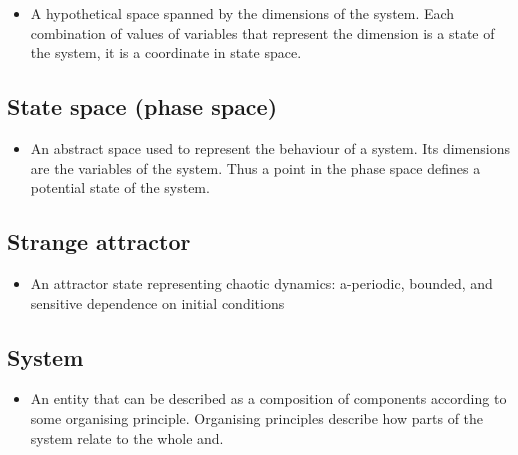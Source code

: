 \documentclass[12pt,]{book}
\providecommand{\tightlist}{%
  \setlength{\itemsep}{0pt}\setlength{\parskip}{0pt}}
\begin{document}
\begin{itemize}
\tightlist
\item
  A hypothetical space spanned by the dimensions of the system. Each combination of values of variables that represent the dimension is a state of the system, it is a coordinate in state space.
\end{itemize}

\hypertarget{Stat71}{%
\subsection*{\texorpdfstring{\textbf{State space (phase space)}}{State space (phase space)}}\label{Stat71}}

\begin{itemize}
\tightlist
\item
  An abstract space used to represent the behaviour of a system. Its dimensions are the variables of the system. Thus a point in the phase space defines a potential state of the system.
\end{itemize}

\hypertarget{Stra72}{%
\subsection*{\texorpdfstring{\textbf{Strange attractor}}{Strange attractor}}\label{Stra72}}

\begin{itemize}
\tightlist
\item
  An attractor state representing chaotic dynamics: a-periodic, bounded, and sensitive dependence on initial conditions
\end{itemize}

\hypertarget{Syst73}{%
\subsection*{\texorpdfstring{\textbf{System}}{System}}\label{Syst73}}

\begin{itemize}
\tightlist
\item
  An entity that can be described as a composition of components according to some organising principle. Organising principles describe how parts of the system relate to the whole and.
\end{itemize}
\end{document}
